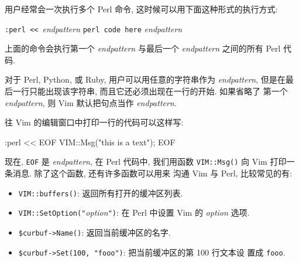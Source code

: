 用户经常会一次执行多个 Perl 命令, 这时候可以用下面这种形式的执行方式:
\begin{vimcmdform}
\texttt{:perl << }\textit{endpattern}
\phantom{    }\texttt{perl code here}
\textit{endpattern}
\end{vimcmdform}
上面的命令会执行第一个 \textit{endpattern} 与最后一个 \textit{endpattern}
之间的所有 Perl 代码.

\begin{warning}
	对于 Perl, Python, 或 Ruby, 用户可以用任意的字符串作为 \textit{endpattern},
	但是在最后一行只能出现该字符串, 而且它还必须出现在一行的开始. 如果省略了
	第一个 \textit{endpattern}, 则 Vim 默认把句点当作 \textit{endpattern}.
\end{warning}

往 Vim 的编辑窗口中打印一行的代码可以这样写:
\begin{vimcode}
:perl << EOF
	VIM::Msg("this is a text");
EOF
\end{vimcode}
现在, \texttt{EOF} 是 \textit{endpattern}, 在 Perl 代码中, 我们用函数
\texttt{VIM::Msg()} 向 Vim 打印一条消息. 除了这个函数, 还有许多函数可以用来
沟通 Vim 与 Perl, 比较常见的有:
\begin{itemize}
	\item \texttt{VIM::buffers()}: 返回所有打开的缓冲区列表.
	\item \texttt{VIM::SetOption("}\textit{option}\texttt{")}: 在 Perl 中设置
		Vim 的 \textit{option} 选项.
	\item \texttt{\$curbuf->Name()}: 返回当前缓冲区的名字.
	\item \texttt{\$curbuf->Set(100, "fooo")}: 把当前缓冲区的第 100 行文本设
		置成 \texttt{fooo}.
\end{itemize}
